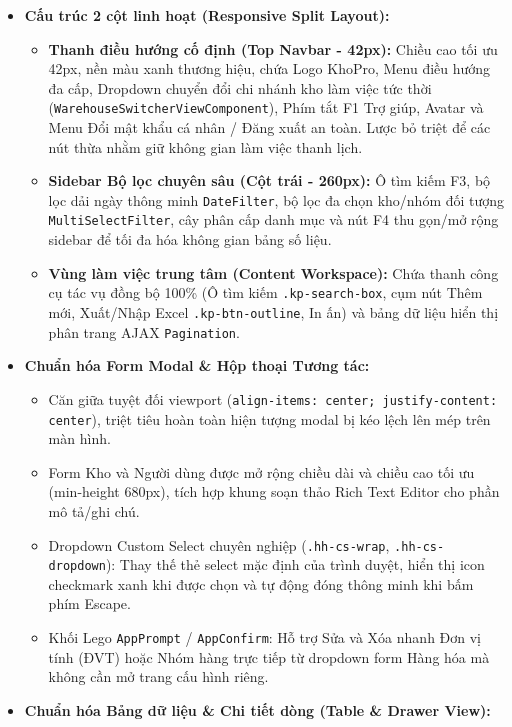 \documentclass[12pt,a4paper]{report}
\renewcommand{\_}{\textunderscore\allowbreak}
\begin{document}
\begin{itemize}
    \item \textbf{Cấu trúc 2 cột linh hoạt (Responsive Split Layout):}
    \begin{itemize}
        \item \textbf{Thanh điều hướng cố định (Top Navbar - 42px):} Chiều cao tối ưu 42px, nền màu xanh thương hiệu, chứa Logo KhoPro, Menu điều hướng đa cấp, Dropdown chuyển đổi chi nhánh kho làm việc tức thời (\texttt{WarehouseSwitcherViewComponent}), Phím tắt F1 Trợ giúp, Avatar và Menu Đổi mật khẩu cá nhân / Đăng xuất an toàn. Lược bỏ triệt để các nút thừa nhằm giữ không gian làm việc thanh lịch.
        \item \textbf{Sidebar Bộ lọc chuyên sâu (Cột trái - 260px):} Ô tìm kiếm F3, bộ lọc dải ngày thông minh \texttt{\_DateFilter}, bộ lọc đa chọn kho/nhóm đối tượng \texttt{\_MultiSelectFilter}, cây phân cấp danh mục và nút F4 thu gọn/mở rộng sidebar để tối đa hóa không gian bảng số liệu.
        \item \textbf{Vùng làm việc trung tâm (Content Workspace):} Chứa thanh công cụ tác vụ đồng bộ 100\% (Ô tìm kiếm \texttt{.kp-search-box}, cụm nút Thêm mới, Xuất/Nhập Excel \texttt{.kp-btn-outline}, In ấn) và bảng dữ liệu hiển thị phân trang AJAX \texttt{\_Pagination}.
    \end{itemize}
    \item \textbf{Chuẩn hóa Form Modal \& Hộp thoại Tương tác:}
    \begin{itemize}
        \item Căn giữa tuyệt đối viewport (\texttt{align-items: center; justify-content: center}), triệt tiêu hoàn toàn hiện tượng modal bị kéo lệch lên mép trên màn hình.
        \item Form Kho và Người dùng được mở rộng chiều dài và chiều cao tối ưu (min-height 680px), tích hợp khung soạn thảo Rich Text Editor cho phần mô tả/ghi chú.
        \item Dropdown Custom Select chuyên nghiệp (\texttt{.hh-cs-wrap}, \texttt{.hh-cs-dropdown}): Thay thế thẻ select mặc định của trình duyệt, hiển thị icon checkmark xanh khi được chọn và tự động đóng thông minh khi bấm phím Escape.
        \item Khối Lego \texttt{AppPrompt} / \texttt{AppConfirm}: Hỗ trợ Sửa và Xóa nhanh Đơn vị tính (ĐVT) hoặc Nhóm hàng trực tiếp từ dropdown form Hàng hóa mà không cần mở trang cấu hình riêng.
    \end{itemize}
    \item \textbf{Chuẩn hóa Bảng dữ liệu \& Chi tiết dòng (Table \& Drawer View):}

\end{itemize}
\end{document}
